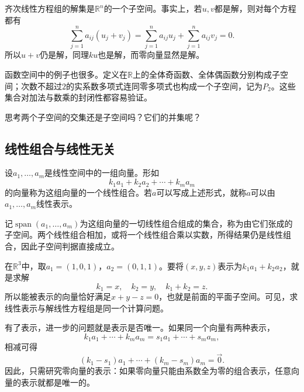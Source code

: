 齐次线性方程组的解集是\(\mathbb{R}^{n}\)的一个子空间。事实上，若\(u , v\)都是解，则对每个方程都有
\begin{equation}
    \sum_{j = 1}^{n} a_{i j} \left( u_{j} + v_{j} \right)
    = \sum_{j = 1}^{n} a_{i j} u_{j} + \sum_{j = 1}^{n} a_{i j} v_{j} = 0 .
\end{equation}
所以\(u + v\)仍是解，同理\(k u\)也是解，而零向量显然是解。

函数空间中的例子也很多。定义在\(\mathbb{R}\)上的全体奇函数、全体偶函数分别构成子空间；次数不超过\(2\)的实系数多项式连同零多项式也构成一个子空间，记为\(P_{2}\)。这些集合对加法与数乘的封闭性都容易验证。

{\kaiti{}思考\quad 两个子空间的交集还是子空间吗？它们的并集呢？}

\subsection{线性组合与线性无关}
设\(a_{1} , \ldots , a_{m}\)是线性空间中的一组向量。形如
\begin{equation}
    k_{1} a_{1} + k_{2} a_{2} + \cdots + k_{m} a_{m}
\end{equation}
的向量称为这组向量的一个{\heiti{}线性组合}。若\(a\)可以写成上述形式，就称\(a\)可以由\(a_{1} , \ldots , a_{m}\)线性表示。

记\(\operatorname{span}\left( a_{1} , \ldots , a_{m} \right)\)为这组向量的一切线性组合组成的集合，称为由它们{\heiti{}张成的子空间}。两个线性组合相加，或将一个线性组合乘以实数，所得结果仍是线性组合，因此子空间判据直接成立。

在\(\mathbb{R}^{3}\)中，取\(a_{1} = \left( 1 , 0 , 1 \right)\)，\(a_{2} = \left( 0 , 1 , 1 \right)\)。要将\(\left( x , y , z \right)\)表示为\(k_{1} a_{1} + k_{2} a_{2}\)，就是求解
\begin{equation}
    k_{1} = x , \quad k_{2} = y , \quad k_{1} + k_{2} = z .
\end{equation}
所以能被表示的向量恰好满足\(x + y - z = 0\)，也就是前面的平面子空间。可见，求线性表示与解线性方程组是同一个计算问题。

有了表示，进一步的问题就是表示是否唯一。如果同一个向量有两种表示，
\begin{equation}
    k_{1} a_{1} + \cdots + k_{m} a_{m} = s_{1} a_{1} + \cdots + s_{m} a_{m} ,
\end{equation}
相减可得
\begin{equation}
    \left( k_{1} - s_{1} \right) a_{1} + \cdots + \left( k_{m} - s_{m} \right) a_{m} = \vec{0} .
\end{equation}
因此，只需研究零向量的表示：如果零向量只能由系数全为零的组合表示，任意向量的表示就都是唯一的。

